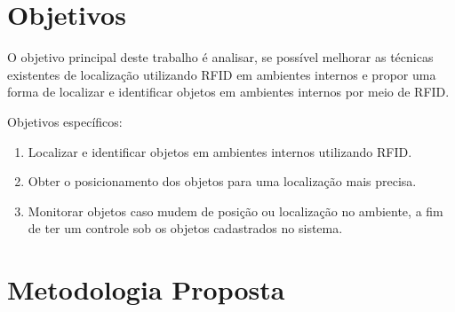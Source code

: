 \section{Objetivos}
O objetivo principal deste trabalho é analisar, se possível melhorar as técnicas existentes de localização utilizando RFID em ambientes internos e propor uma forma de localizar e identificar objetos em ambientes internos por meio de RFID.
\par
Objetivos específicos:
\begin{enumerate}

    \item Localizar e identificar objetos em ambientes internos utilizando RFID.
    
    \item Obter o posicionamento dos objetos para uma localização mais precisa.
    
    \item Monitorar objetos caso mudem de posição ou localização no ambiente, a fim de ter um controle sob os objetos cadastrados no sistema.
    
\end{enumerate}



\section{Metodologia Proposta}


